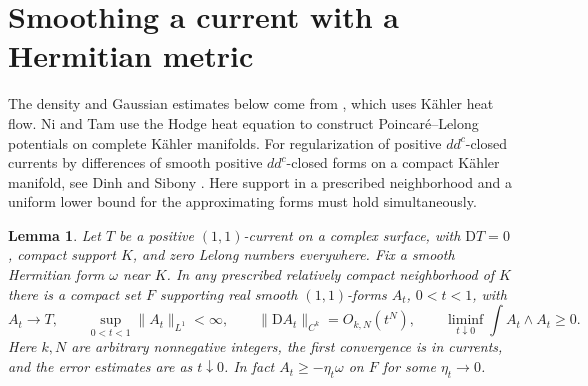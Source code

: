 \documentclass[11pt]{amsart}
\newtheorem{lemma}[theorem]{Lemma}
\theoremstyle{remark}
\numberwithin{equation}{section}
\newcommand{\D}{\mathrm{D}}
\begin{document}
\section{Smoothing a current with a Hermitian metric}

The density and Gaussian estimates below come from
\cite[Proposition~4.1]{Oct}, which uses K\"ahler heat flow.
Ni and Tam \cite{NiTam} use the Hodge heat equation to construct
Poincar\'e--Lelong potentials on complete K\"ahler manifolds.
For regularization of positive $dd^c$-closed currents by differences
of smooth positive $dd^c$-closed forms on a compact K\"ahler manifold,
see Dinh and Sibony \cite[Theorem~4.1]{DS}. Here support in a
prescribed neighborhood and a uniform lower bound for the approximating
forms must hold simultaneously.

\begin{lemma}\label{lem:heat}
Let \(T\) be a positive \((1,1)\)-current on a complex surface, with
\(\D T=0\), compact support \(K\), and zero Lelong numbers everywhere.
Fix a smooth Hermitian form \(\omega\) near \(K\). In any prescribed
relatively compact neighborhood of \(K\) there is a compact set
\(F\) supporting real smooth \((1,1)\)-forms \(A_t\), \(0<t<1\),
with
\[
 A_t\longrightarrow T,\qquad
 \sup_{0<t<1}\|A_t\|_{L^1}<\infty,\qquad
 \|\D A_t\|_{C^k}=O_{k,N}(t^N),\qquad
 \liminf_{t\downarrow0}\int A_t\wedge A_t\geq0.
\]
Here \(k,N\) are arbitrary nonnegative integers, the first
convergence is in currents, and the error estimates are as \(t\downarrow0\).
In fact \(A_t\geq-\eta_t\omega\) on \(F\) for some \(\eta_t\to0\).
\end{lemma}
\end{document}
